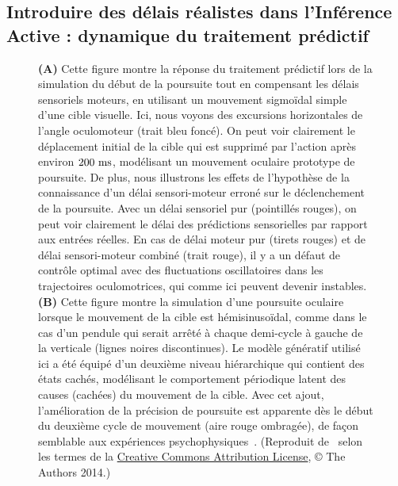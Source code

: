 \subsection{Introduire des délais réalistes dans l'Inférence Active : dynamique du
traitement prédictif}
\begin{figure}%
\caption{\textbf{(A)} Cette figure montre la réponse du traitement
prédictif lors de la simulation du début de la poursuite tout en
compensant les délais sensoriels moteurs, en utilisant un mouvement sigmoïdal simple
d'une cible visuelle. Ici, nous voyons des excursions horizontales de
l'angle oculomoteur (trait bleu foncé). On peut voir clairement le
déplacement initial de la cible qui est supprimé par l'action après
environ $200~\si{\milli\second}$, modélisant un mouvement oculaire prototype de poursuite.
De plus, nous illustrons les effets de l'hypothèse de la connaissance d'un délai
sensori-moteur erroné sur le déclenchement de la poursuite. Avec
un délai sensoriel pur (pointillés rouges), on peut voir
clairement le délai des prédictions sensorielles par rapport aux
entrées réelles. En cas de délai moteur pur (tirets rouges) et de délai sensori-moteur combiné (trait rouge), il y a un
défaut de contrôle optimal avec des fluctuations oscillatoires dans les
trajectoires oculomotrices, qui comme ici peuvent devenir instables. \textbf{(B)}
Cette figure montre la simulation d'une poursuite oculaire lorsque le
mouvement de la cible est hémisinusoïdal, comme dans le cas d'un pendule
qui serait arrêté à chaque demi-cycle à gauche de la verticale (lignes
noires discontinues). Le modèle génératif utilisé ici a été équipé d'un
deuxième niveau hiérarchique qui contient des états cachés, modélisant
le comportement périodique latent des causes (cachées) du mouvement de
la cible. Avec cet ajout, l'amélioration de la précision de poursuite
est apparente dès le début du deuxième cycle de mouvement (aire
rouge ombragée), de façon semblable aux expériences psychophysiques~\citep{Barnes91}. (Reproduit de~\citep{PerrinetAdamsFriston14} selon
les termes de la
\href{https://link.springer.com/article/10.1007/s00422-014-0620-8\#copyrightInformation}{Creative
Commons Attribution License}, © The Authors 2014.)
}
\label{fig:PerrinetAdamsFriston14}
\end{figure}
